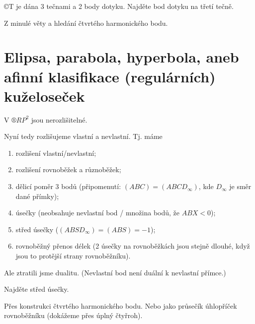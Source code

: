 \documentclass[12pt]{article}					%
\begin{document}
\begin{priklad}[Konstrukce]
	©T je dána 3 tečnami a 2 body dotyku. Najděte bod dotyku na třetí tečně.

	\begin{reseni}
		Z minulé věty a hledání čtvrtého harmonického bodu.
	\end{reseni}
\end{priklad}

\section{Elipsa, parabola, hyperbola, aneb afinní klasifikace (regulárních) kuželoseček}
\begin{poznamka}
	V $®R P^2$ jsou nerozlišitelné.
\end{poznamka}

\begin{poznamka}
	Nyní tedy rozlišujeme vlastní a nevlastní. Tj. máme
	\begin{enumerate}
		\item rozlišení vlastní/nevlastní;
		\item rozlišení rovnoběžek a různoběžek;
		\item dělicí poměr 3 bodů (připomenutí: $(ABC) = (ABCD_∞)$, kde $D_∞$ je směr dané přímky);
		\item úsečky (neobsahuje nevlastní bod / množina bodů, že $ABX < 0$);
		\item střed úsečky ($(ABSD_∞) = (ABS) = -1$);
		\item rovnoběžný přenos délek (2 úsečky na rovnoběžkách jsou stejně dlouhé, když jsou to protější strany rovnoběžníku).
	\end{enumerate}
	Ale ztratili jsme dualitu. (Nevlastní bod není duální k nevlastní přímce.)
\end{poznamka}

\begin{priklad}[Konstrukce]
	Najděte střed úsečky.

	\begin{reseni}
		Přes konstrukci čtvrtého harmonického bodu. Nebo jako průsečík úhlopříček rovnoběžníku (dokážeme přes úplný čtyřroh).
	\end{reseni}
\end{priklad}
\end{document}
